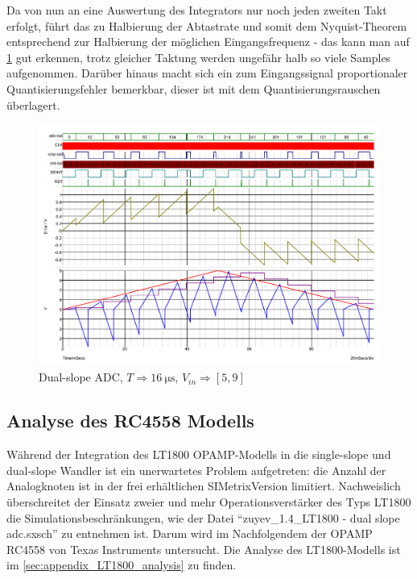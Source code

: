 \documentclass[
	ngerman,
	parskip=half,
	headsepline,
	twocolumn,
	DIV=calc,
	listof=leveldown,
	]{scrartcl}
\begin{document}
		Da von nun an eine Auswertung des Integrators nur noch jeden zweiten Takt erfolgt, führt das zu Halbierung der Abtastrate und somit dem Nyquist-Theorem entsprechend zur Halbierung der möglichen Eingangsfrequenz - das kann man auf \cref{fig:dual-slope-ideal} gut erkennen, trotz gleicher Taktung werden ungefähr halb so viele Samples aufgenommen. Darüber hinaus macht sich ein zum Eingangssignal proportionaler Quantisierungsfehler bemerkbar, dieser ist mit dem Quantisierungsrauschen überlagert.
		
		\begin{figure}
			\centering
			\includegraphics[width=\linewidth]{ideal_dual_slope}
			\caption[Dual-slope ADC]{Dual-slope ADC, $T \Rightarrow \SI{16}{\micro\second}$, $V_{in} \Rightarrow [5,  9]$}
			\label{fig:dual-slope-ideal}
		\end{figure}
	
		\subsection{Analyse des RC4558 Modells}
		\label{sec:opamp_analysis}		
		
		Während der Integration des LT1800 OPAMP-Modells in die single-slope und dual-slope Wandler ist ein unerwartetes Problem aufgetreten: 
		die Anzahl der Analogknoten ist in der frei erhältlichen SIMetrix\texttrademark Version limitiert. Nachweislich überschreitet der Einsatz zweier und mehr Operationsverstärker des Typs LT1800  die Simulationsbeschränkungen, wie der Datei \enquote{zuyev\_1.4\_LT1800 - dual slope adc.sxsch} zu entnehmen ist. Darum wird im Nachfolgendem der OPAMP RC4558 von Texas Instruments untersucht. Die Analyse des LT1800-Modells ist im \cref{sec:appendix_LT1800_analysis} zu finden.		
	
\end{document}
